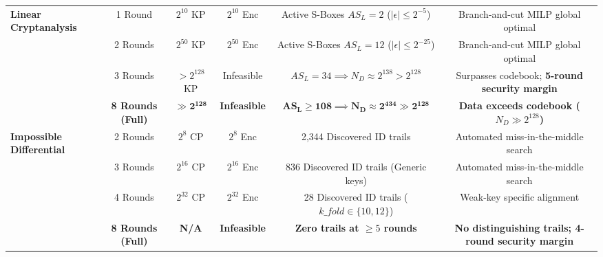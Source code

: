 \documentclass[review,12pt]{elsarticle}
\begin{document}
\begin{table}[htbp]
{\begin{tabular}{@{}lccccc@{}}
\multirow{4}{*}{\textbf{Linear Cryptanalysis}} 
 & 1 Round  & $2^{10}$ KP & $2^{10}$ Enc & Active S-Boxes $AS_L = 2$ ($|\epsilon| \le 2^{-5}$) & Branch-and-cut MILP global optimal \\
 & 2 Rounds & $2^{50}$ KP & $2^{50}$ Enc & Active S-Boxes $AS_L = 12$ ($|\epsilon| \le 2^{-25}$) & Branch-and-cut MILP global optimal \\
 & 3 Rounds & $> 2^{128}$ KP & Infeasible & $AS_L = 34 \implies N_D \approx 2^{138} > 2^{128}$ & Surpasses codebook; \textbf{5-round security margin} \\
 & \textbf{8 Rounds (Full)} & $\mathbf{\gg 2^{128}}$ & \textbf{Infeasible} & $\mathbf{AS_L \ge 108 \implies N_D \approx 2^{434} \gg 2^{128}}$ & \textbf{Data exceeds codebook ($N_D \gg 2^{128}$)} \\ \midrule
\multirow{4}{*}{\textbf{Impossible Differential}} 
 & 2 Rounds & $2^8$ CP  & $2^8$ Enc  & 2,344 Discovered ID trails & Automated miss-in-the-middle search \\
 & 3 Rounds & $2^{16}$ CP & $2^{16}$ Enc & 836 Discovered ID trails (Generic keys) & Automated miss-in-the-middle search \\
 & 4 Rounds & $2^{32}$ CP & $2^{32}$ Enc & 28 Discovered ID trails ($\mathit{k\_fold} \in \{10, 12\}$) & Weak-key specific alignment \\
 & \textbf{8 Rounds (Full)} & \textbf{N/A} & \textbf{Infeasible} & \textbf{Zero trails at $\ge 5$ rounds} & \textbf{No distinguishing trails; 4-round security margin} \\ \bottomrule
\end{tabular}%
}
\end{table}
\end{document}
